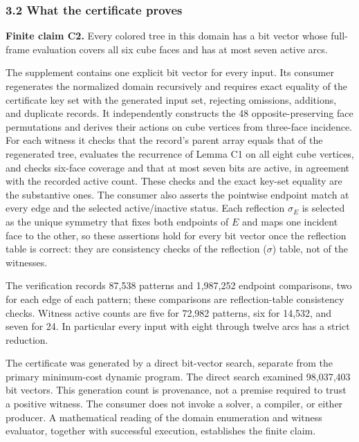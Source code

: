 \documentclass[
  11pt,
]{article}
\begin{document}
\subsubsection{3.2 What the certificate
proves}\label{what-the-certificate-proves}

\textbf{Finite claim C2.} Every colored tree in this domain has a bit
vector whose full-frame evaluation covers all six cube faces and has at
most seven active arcs.

The supplement contains one explicit bit vector for every input. Its
consumer regenerates the normalized domain recursively and requires
exact equality of the certificate key set with the generated input set,
rejecting omissions, additions, and duplicate records. It independently
constructs the 48 opposite-preserving face permutations and derives
their actions on cube vertices from three-face incidence. For each
witness it checks that the record's parent array equals that of the
regenerated tree, evaluates the recurrence of Lemma C1 on all eight cube
vertices, and checks six-face coverage and that at most seven bits are
active, in agreement with the recorded active count. These checks and
the exact key-set equality are the substantive ones. The consumer also
asserts the pointwise endpoint match at every edge and the selected
active/inactive status. Each reflection \(\sigma_E\) is selected as the
unique symmetry that fixes both endpoints of \(E\) and maps one incident
face to the other, so these assertions hold for every bit vector once
the reflection table is correct: they are consistency checks of the
reflection (\(\sigma\)) table, not of the witnesses.

The verification records 87,538 patterns and 1,987,252 endpoint
comparisons, two for each edge of each pattern; these comparisons are
reflection-table consistency checks. Witness active counts are five for
72,982 patterns, six for 14,532, and seven for 24. In particular every
input with eight through twelve arcs has a strict reduction.

The certificate was generated by a direct bit-vector search, separate
from the primary minimum-cost dynamic program. The direct search
examined 98,037,403 bit vectors. This generation count is provenance,
not a premise required to trust a positive witness. The consumer does
not invoke a solver, a compiler, or either producer. A mathematical
reading of the domain enumeration and witness evaluator, together with
successful execution, establishes the finite claim.
\end{document}
